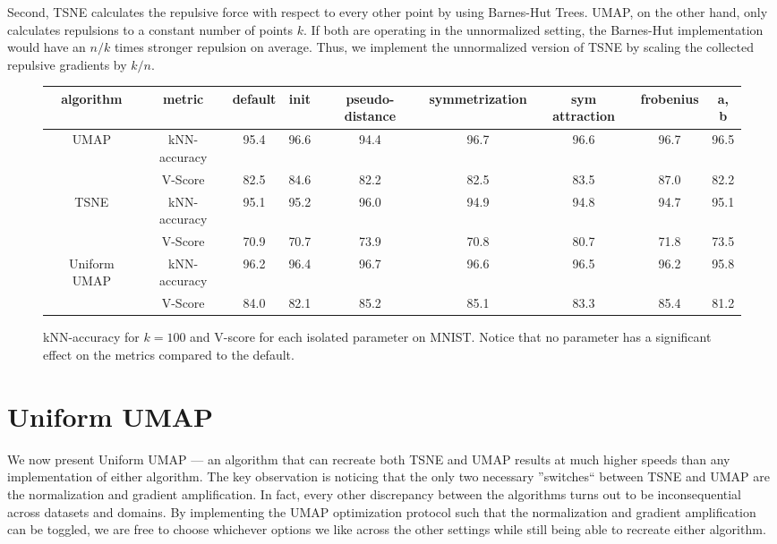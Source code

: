 \documentclass[sigconf, nonacm]{acmart}
\newcommand\ourmethod{Uniform UMAP }
\begin{document}
Second, TSNE calculates the repulsive force with respect to every other point by using Barnes-Hut Trees. UMAP, on the other hand, only calculates repulsions to
a constant number of points $k$. If both are operating in the unnormalized setting, the Barnes-Hut implementation would have an $n/k$ times stronger repulsion
on average. Thus, we implement the unnormalized version of TSNE by scaling the collected repulsive gradients by $k/n$.


\begin{figure*}
    \centering
    \begin{tabular}{|c|c|c|c|c|c|c|c|c|}
    \hline
    algorithm & metric & default & init & pseudo-distance & symmetrization & sym attraction & frobenius & a, b \\
    \hline

    \multirow{2}{*}{UMAP} & kNN-accuracy & 95.4 & 96.6 & 94.4 & 96.7 & 96.6 & 96.7 & 96.5 \\ \cline{2-9}
                          & V-Score & 82.5 & 84.6 & 82.2 & 82.5 & 83.5 & 87.0 & 82.2 \\
    \hline

    \multirow{2}{*}{TSNE} & kNN-accuracy & 95.1 & 95.2 & 96.0 & 94.9 & 94.8 & 94.7 & 95.1 \\ \cline{2-9}
                          & V-Score & 70.9 & 70.7 & 73.9 & 70.8 & 80.7 & 71.8 & 73.5 \\
    \hline

    \multirow{2}{*}{\ourmethod} & kNN-accuracy & 96.2 & 96.4 & 96.7 & 96.6 & 96.5 & 96.2 & 95.8 \\ \cline{2-9}
                                & V-Score & 84.0 & 82.1 & 85.2 & 85.1 & 83.3 & 85.4 & 81.2 \\
    \hline
    \end{tabular}
    \caption{kNN-accuracy for $k=100$ and V-score for each isolated parameter on MNIST. Notice that no parameter has a significant effect on the metrics
    compared to the default.}
    \label{irrelevant-metrics}
\end{figure*}

\section{\ourmethod} \label{uniform}
We now present \ourmethod  --- an algorithm that can recreate both TSNE and UMAP results at much higher speeds than any implementation of either algorithm.
The key observation is noticing that the only two necessary ''switches`` between TSNE and UMAP are the normalization and gradient amplification. In fact,
every other discrepancy between the algorithms turns out to be inconsequential across datasets and domains.
By implementing the UMAP optimization protocol such that the normalization and gradient amplification can be toggled,
we are free to choose whichever options we like across the other settings while still being able to recreate either algorithm.
\end{document}
